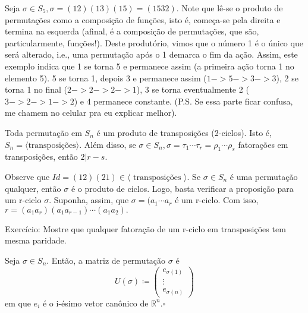 \documentclass[Algebra/algebra_notes.tex]{subfiles}
\begin{document}
\begin{example*}
	Seja $\sigma\in S_{5}, \sigma=(12)(13)(15) = (1532)$. Note que lê-se o produto de permutações como a composição de funções, isto é,
	começa-se pela direita e termina na esquerda (afinal, é a composição de permutações, que são, particularmente, funções!). Deste produtório, vimos que o número 1 é o único que será alterado, i.e., uma permutação após o 1 demarca o fim da ação. Assim, este
	exemplo indica que 1 se torna 5 e permanece assim (a primeira ação torna 1 no elemento 5). 5 se torna 1, depois 3 e permanece assim ($1->5->3->3$), 2 se torna 1
	no final ($2->2->2->1$), 3 se torna eventualmente 2 ($3->2->1->2$) e 4 permanece constante. (P.S. Se essa parte ficar confusa, me chamem no celular pra eu explicar melhor).
\end{example*}
\begin{prop*}
	Toda permutação em $S_{n}$ é um produto de transposições (2-ciclos). Isto é, $S_{n}=\langle\text{transposições}\rangle$.
	Além disso, se $\sigma\in S_{n}, \sigma=\tau_{1}\cdots\tau_{r} = \rho_{1}\cdots\rho_{s}$ fatorações em transposições, então $2|r-s.$
\end{prop*}
\begin{proof*}
	Observe que $Id = (12)(21)\in\langle\text{ transposições }\rangle$. Se $\sigma\in S_{n}$ é uma permutação qualquer, então $\sigma$ é
	o produto de ciclos. Logo, basta verificar a proposição para um r-ciclo $\sigma.$ Suponha, assim, que $\sigma = (a_{1}\cdots a_{r}$ é um r-ciclo.
	Com isso, $r=(a_{1}a_{r})(a_{1}a_{r-1})\cdots(a_{1}a_{2}).$ \qedsymbol
\end{proof*}
\begin{prop*}
	Exercício: Mostre que qualquer fatoração de um r-ciclo em transposições tem mesma paridade.
\end{prop*}
\begin{def*}
	Seja $\sigma\in S_{n}$. Então, a matriz de permutação $\sigma$ é
	$$
		U(\sigma)\coloneqq \begin{pmatrix}
			e_{\sigma(1)} \\
			\vdots        \\
			e_{\sigma(n)}
		\end{pmatrix}
	$$
	em que $e_{i}$ é o i-ésimo vetor can\^onico de $\mathbb{R}^{n}.\square$
\end{def*}
\end{document}

